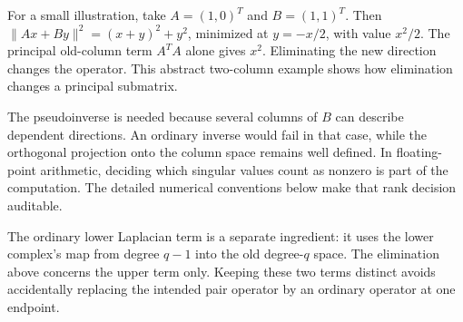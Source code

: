 For a small illustration, take $A=(1,0)^T$ and $B=(1,1)^T$. Then $\|Ax+By\|^2=(x+y)^2+y^2$, minimized at $y=-x/2$, with value $x^2/2$. The principal old-column term $A^TA$ alone gives $x^2$. Eliminating the new direction changes the operator. This abstract two-column example shows how elimination changes a principal submatrix.

The pseudoinverse is needed because several columns of $B$ can describe dependent directions. An ordinary inverse would fail in that case, while the orthogonal projection onto the column space remains well defined. In floating-point arithmetic, deciding which singular values count as nonzero is part of the computation. The detailed numerical conventions below make that rank decision auditable.

The ordinary lower Laplacian term is a separate ingredient: it uses the lower complex's map from degree $q-1$ into the old degree-$q$ space. The elimination above concerns the upper term only. Keeping these two terms distinct avoids accidentally replacing the intended pair operator by an ordinary operator at one endpoint.
